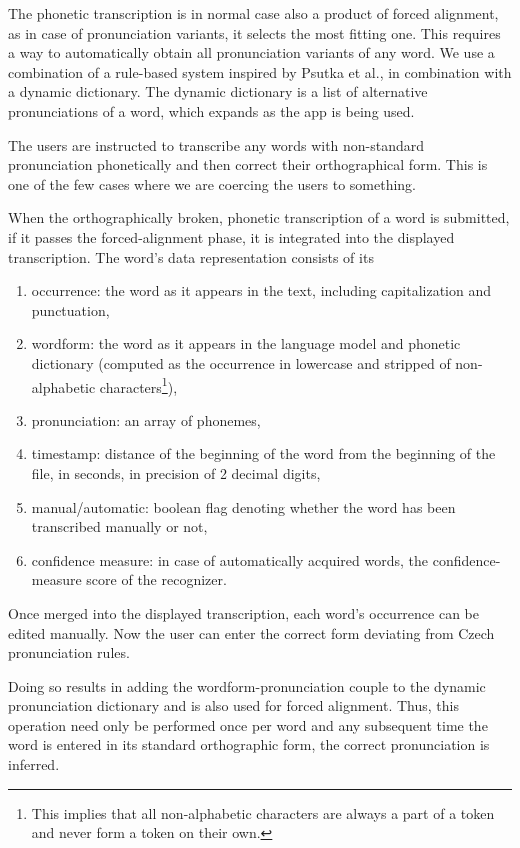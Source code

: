 \documentclass{itatnew}
\begin{document}
The phonetic transcription is in normal case also a product of forced alignment,
as in case of pronunciation variants, it selects the most fitting one. This
requires a way to automatically obtain all pronunciation variants of any word.
We use a combination of a rule-based system inspired by Psutka et
al.\cite{psutka2004development}, in combination with a dynamic dictionary.
The dynamic dictionary is a list of alternative pronunciations of a word, which
expands as the app is being used.

The users are instructed to transcribe any words with non-standard pronunciation
phonetically and then correct their orthographical form. This is one of the few
cases where we are coercing the users to something.

When the orthographically broken, phonetic transcription of a word is submitted,
if it passes the forced-alignment phase, it is integrated into the displayed
transcription. The word's data representation consists of its
\begin{enumerate}
\item{occurrence:
    the word as it appears in the text, including capitalization and
    punctuation,
}
\item{wordform:
    the word as it appears in the language model and phonetic dictionary
    (computed as the occurrence in lowercase and stripped of non-alphabetic
    characters\footnote{This implies that all non-alphabetic characters are
    always a part of a token and never form a token on their own.}),
}
\item{pronunciation:
    an array of phonemes,
}
\item{timestamp:
    distance of the beginning of the word from the beginning of the file, in
    seconds, in precision of 2 decimal digits,
}
\item{manual/automatic:
    boolean flag denoting whether the word has been transcribed manually or not,
}
\item{confidence measure:
    in case of automatically acquired words, the confidence-measure score of the
    recognizer.
}
\end{enumerate}
Once merged into the displayed transcription, each word's occurrence can be
edited manually. Now the user can enter the correct form deviating from Czech
pronunciation rules.

Doing so results in adding the wordform-pronunciation couple to the dynamic
pronunciation dictionary and is also used for forced alignment. Thus, this
operation need only be performed once per word and any subsequent time the word
is entered in its standard orthographic form, the correct pronunciation is
inferred.
\end{document}
